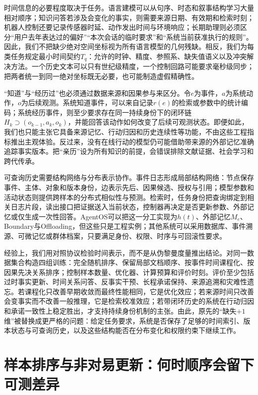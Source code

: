 时间信息的必要程度取决于任务。语言建模可以从句序、时态和叙事结构学习大量相对顺序；知识问答若涉及会变化的事实，则需要来源日期、有效期和检索时刻；机器人控制还要记录传感器时延、动作发出时间与环境响应；长期助理则必须区分“用户去年表达过的偏好”“本次会话的临时要求”和“系统当前获准执行的规则”。因此，我们不把缺少绝对空间坐标视为所有语言模型的几何残缺。相反，我们为每类任务规定最小时间契约$T_q$：允许的时钟、精度、参照系、缺失值语义以及冲突解决方法。一个历史文本可以只有世纪级精度，一个控制回路可能要求毫秒级同步；把两者统一到同一绝对坐标既无必要，也可能制造虚假精确性。

“知道”与“经历过”也必须通过数据来源和因果参与来区分。令$e$为事件，$a$为系统动作，$o$为后续观测。系统知道事件，可以来自记录$r(e)$的检索或参数中的统计编码；系统经历事件，则至少要求存在同一持续身份下的闭环链$H_k\supset(o_{k-1},a_k,o_k)$，并能回答该动作如何改变了后续可观测状态。即便如此，我们也只能主张它具备来源记忆、行动归因和历史连续性等功能，不由这些工程指标推出主观体验。反过来，没有在线行动的模型仍可能借助带来源的外部记忆准确追踪事实版本。把“亲历”设为所有知识的前提，会错误排除文献证据、社会学习和跨代传承。

可查询历史需要结构网络与分布表示协作。事件日志形成局部结构网络：节点保存事件、主体、对象和版本身份，边表示先后、因果候选、授权与引用；模型参数和活动状态则提供跨样本的分布式相似性与预测。检索时，任务身份把查询绑定到相关日志片段，读出接口把证据送入当前状态，控制器再决定是否更新参数、外部记忆或仅生成一次性回答。AgentOS可以把这一分工实现为$h(t)$、外部记忆$M_e$、Boundary与Offloading，但这些只是工程实例；其他系统可以采用数据库、事件溯源、可微记忆或群体档案，只要满足身份、权限、时序与可回滚性要求。

经验上，我们用对照协议检验时间表示，而不是从伪黎曼度量推出结论。对同一数据集合构造四组训练：完全随机排序、保留局部文档顺序、按事件时间课程化、按因果先决关系排序；控制样本数量、优化器、计算预算和评价时刻。评价至少包括过时事实更新、时间关系问答、反事实干预、长程承诺保持、来源追溯和灾难性遗忘。若课程化只改善早期收敛而最终性能相同，它是优化效应；若来源时间只改善会变事实而不改善一般推理，它是检索校准效应；若带闭环历史的系统在行动归因和承诺一致性上稳定胜出，才支持持续身份机制的主张。由此，原先的“缺失$+1$维”被替换成更严格的问题：给定任务要求，系统是否保存了足够的时间索引、版本状态与可查询历史，以及这些结构能否在分布变化和权限约束下继续工作。

\section{样本排序与非对易更新：何时顺序会留下可测差异}
\label{sec:thermodynamic_shattering_of_shuffling}


